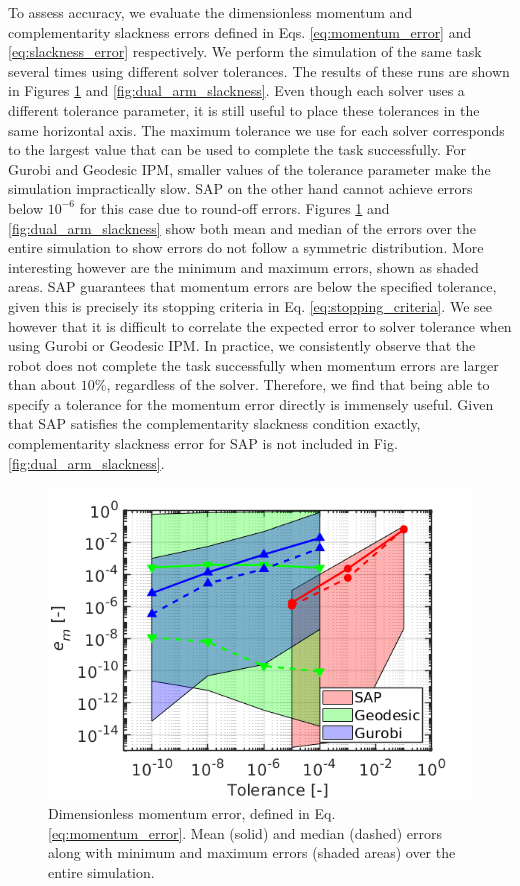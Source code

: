 To assess accuracy, we evaluate the dimensionless momentum and complementarity
slackness errors defined in Eqs. \eqref{eq:momentum_error} and
\eqref{eq:slackness_error} respectively. We perform the simulation of the same
task several times using different solver tolerances. The results of these runs
are shown in Figures \ref{fig:dual_arm_momentum} and
\ref{fig:dual_arm_slackness}. Even though each solver uses a different tolerance
parameter, it is still useful to place these tolerances in the same horizontal
axis. The maximum tolerance we use for each solver corresponds to the largest
value that can be used to complete the task successfully. For Gurobi and
Geodesic IPM, smaller values of the tolerance parameter make the simulation
impractically slow. SAP on the other hand cannot achieve errors below $10^{-6}$
for this case due to round-off errors. Figures \ref{fig:dual_arm_momentum} and
\ref{fig:dual_arm_slackness} show both mean and median of the errors over the
entire simulation to show errors do not follow a symmetric distribution. More
interesting however are the minimum and maximum errors, shown as shaded areas.
SAP guarantees that momentum errors are below the specified tolerance, given
this is precisely its stopping criteria in Eq. \eqref{eq:stopping_criteria}. We
see however that it is difficult to correlate the expected error to solver
tolerance when using Gurobi or Geodesic IPM. In practice, we consistently
observe that the robot does not complete the task successfully when
momentum errors are larger than about $10\%$, regardless of the solver.
Therefore, we find that being able to specify a tolerance for the momentum
error directly is immensely useful. Given that SAP satisfies the complementarity
slackness condition exactly, complementarity slackness error for SAP is not
included in Fig. \ref{fig:dual_arm_slackness}.

\begin{figure}[!h]
	\centering
    \includegraphics[width=0.7\columnwidth]{figures/dual_arm/momentum_error.png}
    \caption{\label{fig:dual_arm_momentum} Dimensionless momentum error, defined
    in Eq. \eqref{eq:momentum_error}. Mean (solid) and median (dashed) errors
    along with minimum and maximum errors (shaded areas) over the entire
    simulation.}
\end{figure}

